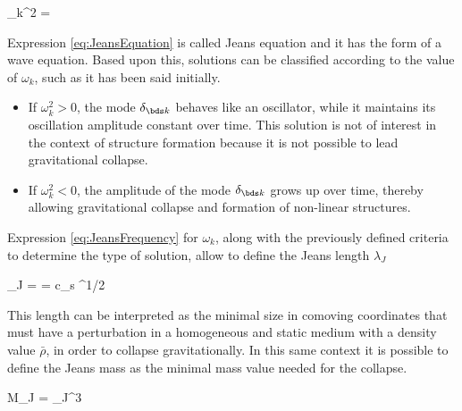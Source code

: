 {\omega_k^2 =  }
	

Expression \ref{eq:JeansEquation} is called Jeans equation and it has the
form of a wave equation. Based upon this, solutions can be classified 
according to the value of $\omega_k$, such as it has been said initially.


\begin{itemize}
\item If $\omega_k^2>0$, the mode $\delta_{\bds k}$ behaves like an 
oscillator, while it maintains its oscillation amplitude constant over 
time. This solution is not of interest in the context of structure 
formation because it is not possible to lead gravitational collapse.


\item If $\omega_k^2<0$, the amplitude of the mode $\delta_{\bds k}$ grows
up over time, thereby allowing gravitational collapse and formation of 
non-linear structures.
\end{itemize}


Expression \ref{eq:JeansFrequency} for $\omega_k$, along with the 
previously defined criteria to determine the type of solution, allow to 
define the Jeans length $\lambda_J$



{ \lambda_J =  = 
c_s ^{1/2} }


This length can be interpreted as the minimal size in comoving coordinates
that must have a perturbation in a homogeneous and static medium with a 
density value $\bar \rho$, in order to collapse gravitationally. In this
same context it is possible to define the Jeans mass as the minimal mass
value needed for the collapse.



{ M_J = \pi \lambda_J^3 \propto {} }


